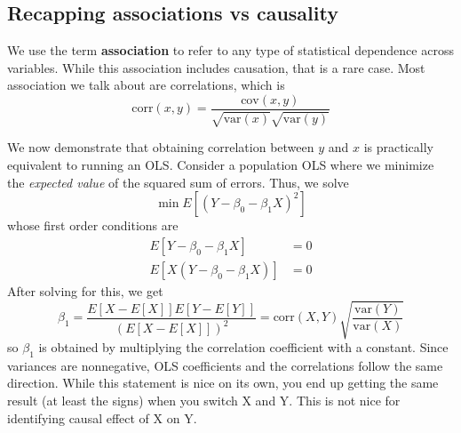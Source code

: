 \documentclass[12pt]{article}
\theoremstyle{definition}
\theoremstyle{property}
\theoremstyle{assumption}
\theoremstyle{example}
\theoremstyle{comment}
\begin{document}
\subsection{Recapping associations vs causality}
We use the term \textbf{association} to refer to any type of statistical dependence across variables. While this association includes causation, that is a rare case. Most association we talk about are correlations, which is
\[
\text{corr}(x,y) = \frac{\text{cov}(x,y)}{\sqrt{\text{var}(x)}\sqrt{\text{var}(y)}}
\]
\par
We now demonstrate that obtaining correlation between $y$ and $x$ is practically equivalent to running an OLS. Consider a population OLS where we minimize the \textit{expected value} of the squared sum of errors. Thus, we solve
\[
\min E[(Y-\beta_0-\beta_1X)^2]
\]
whose first order conditions are
\[
\begin{aligned}
E[Y-\beta_0-\beta_1X]&=0\\
E[X(Y-\beta_0-\beta_1X)]&=0
\end{aligned}
\]
After solving for this, we get
\[
\beta_1 = \frac{E[X-E[X]]E[Y-E[Y]]}{(E[X-E[X]])^2} = \text{corr}(X,Y)\sqrt{\frac{\text{var}(Y)}{\text{var}(X)}}
\]
so $\beta_1$ is obtained by multiplying the correlation coefficient with a constant. Since variances are nonnegative, OLS coefficients and the correlations follow the same direction. While this statement is nice on its own, you end up getting the same result (at least the signs) when you switch X and Y. This is not nice for identifying causal effect of X on Y.
\end{document}
